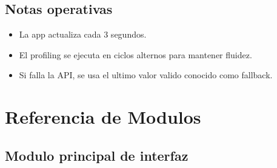 \documentclass[letterpaper,10pt,spanish]{sphinxmanual}
\begin{document}
\subsection{Notas operativas}
\label{\detokenize{uso:notas-operativas}}\begin{itemize}
\item {} 
\sphinxAtStartPar
La app actualiza cada 3 segundos.

\item {} 
\sphinxAtStartPar
El profiling se ejecuta en ciclos alternos para mantener fluidez.

\item {} 
\sphinxAtStartPar
Si falla la API, se usa el ultimo valor valido conocido como fallback.

\end{itemize}

\sphinxstepscope


\section{Referencia de Modulos}
\label{\detokenize{modulos:referencia-de-modulos}}\label{\detokenize{modulos::doc}}

\subsection{Modulo principal de interfaz}
\label{\detokenize{modulos:module-main}}\label{\detokenize{modulos:modulo-principal-de-interfaz}}
\end{document}
